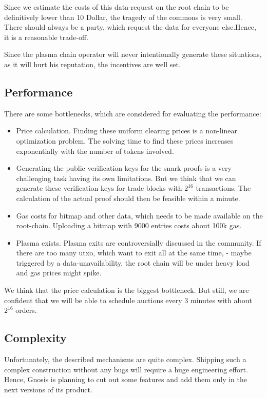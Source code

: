 \documentclass[11pt,parskip=full]{scrartcl}%
\begin{document}
Since we estimate the costs of this data-request on the root chain to be definitively lower than 10 Dollar, the tragedy of the commons is very small.
There should always be a party, which request the data for everyone else.Hence, it is a reasonable trade-off.

Since the plasma chain operator will never intentionally generate these situations, as it will hurt his reputation, the incentives are well set.

\subsection{Performance}
There are some bottlenecks, which are considered for evaluating the performance:
\begin{itemize}
\item Price calculation.
Finding these uniform clearing prices is a non-linear optimization problem.
The solving time to find these prices increases exponentially with the number of tokens involved.
\item Generating the public verification keys for the snark proofs is a very challenging task having its own limitations.
But we think that we can generate these verification keys for trade blocks with $2^{16}$ transactions.
The calculation of the actual proof should then be feasible within a minute.
\item Gas costs for bitmap and other data, which needs to be made available on the root-chain.
Uploading a bitmap with 9000 entries costs about 100k gas.
\item Plasma exists.
Plasma exits are controversially discussed in the community.
If there are too many utxo, which want to exit all at the same time, - maybe triggered by a data-unavailability, the root chain will be under heavy load and gas prices might spike.
\end{itemize}
We think that the price calculation is the biggest bottleneck.
But still, we are confident that we will be able to schedule auctions every 3 minutes with about $2^{16}$ orders.
\subsection{Complexity}
Unfortunately, the described mechanisms are quite complex.
Shipping such a complex construction without any bugs will require a huge engineering effort.
Hence, Gnosis is planning to cut out some features and add them only in the next versions of its product.
\end{document}
